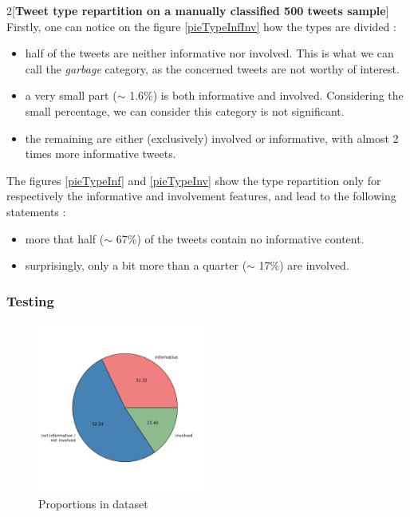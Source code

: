 \documentclass[a4paper,12pt]{report}
\begin{document}
\begin{multicols}{2}[\textbf{Tweet type repartition on a manually classified 500 tweets sample}]
Firstly, one can notice on the figure \ref{pieTypeInfInv} how the types are divided : 
\begin{itemize}
\item half of the tweets are neither informative nor involved. This is what we can call the \emph{garbage} category, as the concerned tweets are not worthy of interest.
\item a very small part ($\sim$ 1.6\%) is both informative and involved. Considering the small percentage, we can consider this category is not significant.
\item the remaining are either (exclusively) involved or informative, with almost 2 times more informative tweets.
\end{itemize}

\vspace*{1cm}

The figures \ref{pieTypeInf} and \ref{pieTypeInv} show the type repartition only for respectively the informative and involvement features, and lead to the following statements :
\begin{itemize}
\item more that half ($\sim$ 67\%) of the tweets contain no informative content.
\item surprisingly, only a bit more than a quarter ($\sim$ 17\%) are involved.
\end{itemize}


\end{multicols}

\subsubsection{Testing}

\begin{figure}[H]
\centering
\includegraphics[width=0.5\textwidth]{images/plots/pies/pie_pairs3.png}
\caption{Proportions in dataset}
\end{figure}
\end{document}
